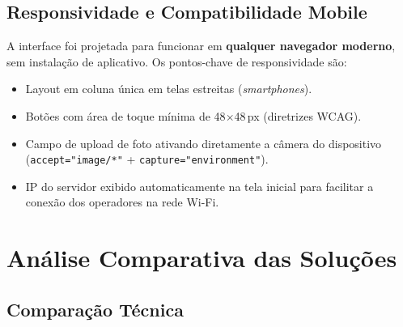 \documentclass[12pt,a4paper]{article}
\begin{document}
\subsection{Responsividade e Compatibilidade Mobile}

A interface foi projetada para funcionar em \textbf{qualquer navegador moderno}, sem
instala\c{c}\~ao de aplicativo. Os pontos-chave de responsividade s\~ao:

\begin{itemize}[leftmargin=*]
  \item Layout em coluna \'unica em telas estreitas (\emph{smartphones}).
  \item Bot\~oes com \'area de toque m\'inima de 48$\times$48\,px (diretrizes WCAG).
  \item Campo de upload de foto ativando diretamente a c\^amera do dispositivo
        (\texttt{accept="image/*"} + \texttt{capture="environment"}).
  \item IP do servidor exibido automaticamente na tela inicial para facilitar
        a conex\~ao dos operadores na rede Wi-Fi.
\end{itemize}

\section{An\'alise Comparativa das Solu\c{c}\~oes}
\label{sec:comparativo}

\subsection{Compara\c{c}\~ao T\'ecnica}
\end{document}
